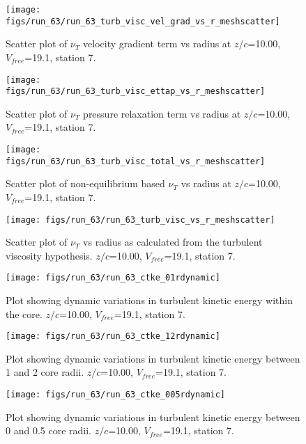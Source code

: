 \begin{figure}[H]
\centering
\texttt{[image: figs/run\_63/run\_63\_turb\_visc\_vel\_grad\_vs\_r\_meshscatter]}
\caption{Scatter plot of $\nu_T$ velocity gradient term vs radius at $z/c$=10.00, $V_{free}$=19.1, station 7.}
\end{figure}


\begin{figure}[H]
\centering
\texttt{[image: figs/run\_63/run\_63\_turb\_visc\_ettap\_vs\_r\_meshscatter]}
\caption{Scatter plot of $\nu_T$ pressure relaxation term vs radius at $z/c$=10.00, $V_{free}$=19.1, station 7.}
\end{figure}


\begin{figure}[H]
\centering
\texttt{[image: figs/run\_63/run\_63\_turb\_visc\_total\_vs\_r\_meshscatter]}
\caption{Scatter plot of non-equilibrium based $\nu_T$ vs radius at $z/c$=10.00, $V_{free}$=19.1, station 7.}
\end{figure}


\begin{figure}[H]
\centering
\texttt{[image: figs/run\_63/run\_63\_turb\_visc\_vs\_r\_meshscatter]}
\caption{Scatter plot of $\nu_T$ vs radius as calculated from the turbulent viscosity hypothesis. $z/c$=10.00, $V_{free}$=19.1, station 7.}
\end{figure}


\begin{figure}[H]
\centering
\texttt{[image: figs/run\_63/run\_63\_ctke\_01rdynamic]}
\caption{Plot showing dynamic variations in turbulent kinetic energy within the core. $z/c$=10.00, $V_{free}$=19.1, station 7.}
\end{figure}


\begin{figure}[H]
\centering
\texttt{[image: figs/run\_63/run\_63\_ctke\_12rdynamic]}
\caption{Plot showing dynamic variations in turbulent kinetic energy between 1 and 2 core radii. $z/c$=10.00, $V_{free}$=19.1, station 7.}
\end{figure}


\begin{figure}[H]
\centering
\texttt{[image: figs/run\_63/run\_63\_ctke\_005rdynamic]}
\caption{Plot showing dynamic variations in turbulent kinetic energy between 0 and 0.5 core radii. $z/c$=10.00, $V_{free}$=19.1, station 7.}
\end{figure}


